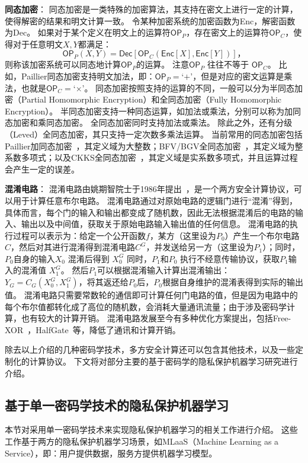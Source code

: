 \textbf{同态加密}：
同态加密是一类特殊的加密算法，其支持在密文上进行一定的计算，使得解密的结果和明文计算一致。
%
令某种加密系统的加密函数为\textsf{Enc}，解密函数为\textsf{Dec}。
%
如果对于某个定义在明文上的运算符$\mathsf{OP}_P$，存在密文上的运算符$\mathsf{OP}_C$，使得对于任意明文$X, Y$都满足：
\begin{equation}
    \textsf{OP}_P(X, Y) = \mathsf{Dec}[\mathsf{OP}_C (\mathsf{Enc}[X], \mathsf{Enc}[Y])]，
\end{equation}
%
则称该加密系统可以同态地计算$\mathsf{OP}_P$的运算。
%
注意$\mathsf{OP}_P$ 往往不等于 $\mathsf{OP}_C$。
比如，Paillier同态加密支持明文加法，即：$\mathsf{OP}_P=$`$+$'，但是对应的密文运算是乘法，也就是$\mathsf{OP}_C=$`$\times$'。
%
同态加密按照支持的运算的不同，一般可以分为半同态加密（Partial Homomorphic Encryption）和全同态加密（Fully Homomorphic Encryption）。
%
半同态加密支持一种同态运算，如加法或乘法，分别可以称为加同态加密和乘同态加密。
%
全同态加密同时支持加法或乘法。
%
除此之外，还有分级（Leved）全同态加密，其只支持一定次数多乘法运算。
%
当前常用的同态加密包括Paillier加同态加密~\cite{paillier1999}，其定义域为大整数；BFV/BGV全同态加密~\cite{2012bfv1,2012bfv2,2014bgv}，其定义域为整系数多项式；以及CKKS全同态加密~\cite{ckks2017}，其定义域是实系数多项式，并且运算过程会产生一定的误差。


\textbf{混淆电路}：
混淆电路由姚期智院士于1986年提出~\cite{yao1986gc}，是一个两方安全计算协议，可以用于计算任意布尔电路。
%
混淆电路通过对原始电路的逻辑门进行“混淆”得到，具体而言，每个门的输入和输出都变成了随机数，因此无法根据混淆后的电路的输入、输出以及中间值，获取关于原始电路输入输出值的任何信息。
%
混淆电路的执行过程可以表示为：给定一个公开函数$f$，某方（这里设为$P_0$）产生一个布尔电路$C$，然后对其进行混淆得到混淆电路$C^G$，并发送给另一方（这里设为$P_1$）；同时，$P_0$自身的输入$X_0$ 混淆后得到 $X_0^G$
%
同时，$P_1$和$P_0$ 执行不经意传输协议，获取$P_1$输入的混淆值 $X_1^G$。
%
然后$P_1$可以根据混淆输入计算出混淆输出：$Y_G = C_G(X_0^G, X_1^G)$，将其返还给$P_0$后，$P_0$根据自身维护的混淆表得到实际的输出值。
%
混淆电路只需要常数轮的通信即可计算任何门电路的值，但是因为电路中的每个布尔值都转化成了高位的随机数，会消耗大量通讯流量；由于涉及密码学计算，也有较大的计算开销。
%
混淆电路发展至今有多种优化方案提出，包括Free-XOR~\cite{kolesnikov2008free_xor}，HalfGate~\cite{zahur2015halfgate}等，降低了通讯和计算开销。
%

除去以上介绍的几种密码学技术，多方安全计算还可以包含其他技术，以及一些定制化的计算协议。
%
下文将对部分主要的基于密码学的隐私保护机器学习研究进行介绍。


\subsection{基于单一密码学技术的隐私保护机器学习}
本节对采用单一密码学技术来实现隐私保护机器学习的相关工作进行介绍。
%
这些工作基于两方的隐私保护机器学习场景，如MLaaS（Machine Learning as a Service），即：用户提供数据，服务方提供机器学习模型。
%

